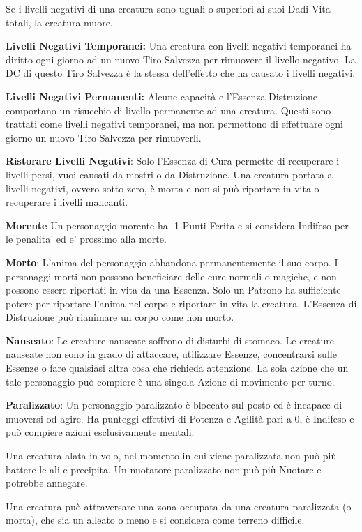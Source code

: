 \documentclass[a4paper,11pt,twoside,openany]{book}
\begin{document}
Se i livelli negativi di una creatura sono uguali o superiori ai suoi Dadi Vita totali, la creatura muore.

\textbf{Livelli Negativi Temporanei:} Una creatura con livelli negativi temporanei ha diritto ogni giorno ad un nuovo Tiro Salvezza per rimuovere il livello negativo. La DC di questo Tiro Salvezza è la stessa dell'effetto che ha causato i livelli negativi.

\textbf{Livelli Negativi Permanenti:} Alcune capacità e l'Essenza Distruzione comportano un risucchio di livello permanente ad una creatura. Questi sono trattati come livelli negativi temporanei, ma non permettono di effettuare ogni giorno un nuovo Tiro Salvezza per rimuoverli.

\textbf{Ristorare Livelli Negativi}: Solo l'Essenza di Cura permette di recuperare i livelli persi, vuoi causati da mostri o da Distruzione. Una creatura portata a livelli negativi, ovvero sotto zero, è morta e non si può riportare in vita o recuperare i livelli mancanti.

\textbf{Morente} Un personaggio morente ha -1 Punti Ferita e si considera Indifeso per le penalita' ed e' prossimo alla morte.

\textbf{Morto}: L'anima del personaggio abbandona permanentemente il suo corpo. I personaggi morti non possono beneficiare delle cure normali o magiche, e non possono essere riportati in vita da una Essenza. Solo un Patrono ha sufficiente potere per riportare l'anima nel corpo e riportare in vita la creatura. L'Essenza di Distruzione può rianimare un corpo come non morto.

\textbf{Nauseato}: Le creature nauseate soffrono di disturbi di stomaco.
Le creature nauseate non sono in grado di attaccare, utilizzare Essenze, concentrarsi sulle Essenze o fare qualsiasi altra cosa che richieda attenzione. La sola azione che un tale personaggio può compiere è una singola Azione di movimento per turno.

\textbf{Paralizzato}: Un personaggio paralizzato è bloccato sul posto ed è incapace di muoversi od agire. Ha punteggi effettivi di Potenza e Agilità pari a 0, è Indifeso e può compiere azioni esclusivamente mentali.

Una creatura alata in volo, nel momento in cui viene paralizzata non può più battere le ali e precipita.
Un nuotatore paralizzato non può più Nuotare e potrebbe annegare.

Una creatura può attraversare una zona occupata da una creatura paralizzata (o morta), che sia un alleato o meno e si considera come terreno difficile.
\end{document}
